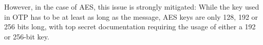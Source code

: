 \documentclass[12pt]{report}
\theoremstyle{definition}
\theoremstyle{remark}
\begin{document}
However, in the case of AES, this issue is strongly mitigated: While the key used in OTP has to be at least as long as the message, AES keys are only 128, 192 or 256 bits long, with top secret documentation requiring the usage of either a 192 or 256-bit key\cite{CNSSPolicy}.

\printbibliography
\end{document}
